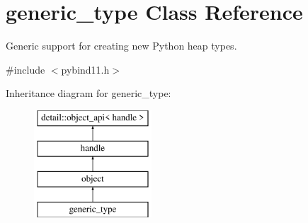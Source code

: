 \hypertarget{classgeneric__type}{}\section{generic\+\_\+type Class Reference}
\label{classgeneric__type}


Generic support for creating new Python heap types.  




{\ttfamily \#include $<$pybind11.\+h$>$}

Inheritance diagram for generic\+\_\+type\+:\begin{figure}[H]
\begin{center}
\leavevmode
\includegraphics[height=4.000000cm]{classgeneric__type}
\end{center}
\end{figure}

